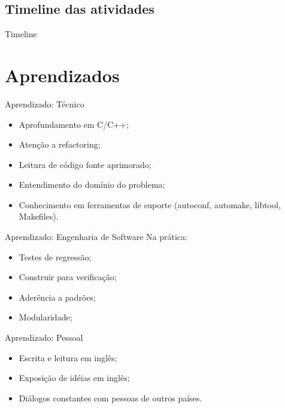 \subsection{Timeline das atividades}

  \begin{frame}{Timeline}
  \end{frame}


\section{Aprendizados}
\begin{frame}{Aprendizado: Técnico}
  \begin{itemize}
  \item Aprofundamento em C/C++;
  \item Atenção a refactoring;
  \item Leitura de código fonte aprimorado;
  \item Entendimento do domínio do problema;
  \item Conhecimento em ferramentas de suporte (autoconf, automake, libtool, Makefiles).
  \end{itemize}
\end{frame}

\begin{frame}{Aprendizado: Engenharia de Software}
Na prática:
  \begin{itemize}
  \item Testes de regressão;
  \item Construir para verificação;
  \item Aderência a padrões;
  \item Modularidade;
  \end{itemize}
\end{frame}

\begin{frame}{Aprendizado: Pessoal}
  \begin{itemize}
  \item Escrita e leitura em inglês; 
  \item Exposição de idéias em inglês;
  \item Diálogos constantes com pessoas de outros países.
  \end{itemize}
\end{frame}


